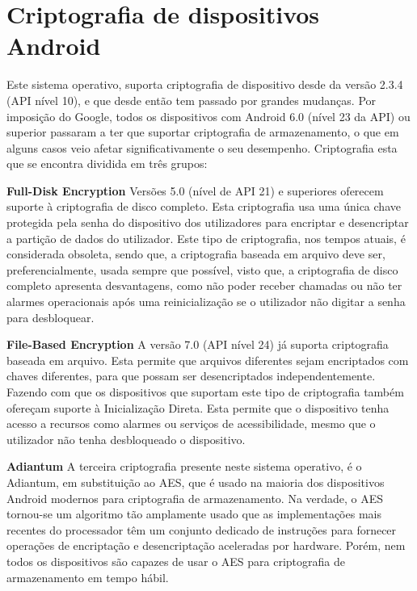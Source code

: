 \documentclass{article}
\begin{document}
\section{Criptografia de dispositivos Android}
Este sistema operativo, suporta criptografia de dispositivo desde da versão 2.3.4 (API nível 10), e que desde então tem passado por grandes mudanças. Por imposição do Google, todos os dispositivos com Android 6.0 (nível 23 da API) ou superior passaram a ter que suportar criptografia de armazenamento, o que em alguns casos veio afetar significativamente o seu desempenho. Criptografia esta que se encontra dividida em três grupos: 
\\
\par \textbf{Full-Disk Encryption} 
Versões 5.0 (nível de API 21) e superiores oferecem suporte à criptografia de disco completo. Esta criptografia usa uma única chave protegida pela senha do dispositivo dos utilizadores para encriptar e desencriptar a partição de dados do utilizador. Este tipo de criptografia, nos tempos atuais, é considerada obsoleta, sendo que, a criptografia baseada em arquivo deve ser, preferencialmente, usada sempre que possível, visto que, a criptografia de disco completo apresenta desvantagens, como não poder receber chamadas ou não ter alarmes operacionais após uma reinicialização se o utilizador não digitar a senha para desbloquear.
\\
\par \textbf{File-Based Encryption}
A versão 7.0 (API nível 24) já suporta criptografia baseada em arquivo. Esta permite que arquivos diferentes sejam encriptados com chaves diferentes, para que possam ser desencriptados independentemente. Fazendo com que os dispositivos que suportam este tipo de criptografia também ofereçam suporte à Inicialização Direta. Esta permite que o dispositivo tenha acesso a recursos como alarmes ou serviços de acessibilidade, mesmo que o utilizador não tenha desbloqueado o dispositivo.
\\
\par \textbf{Adiantum}
A terceira criptografia presente neste sistema operativo, é o Adiantum, em substituição ao AES, que é usado na maioria dos dispositivos Android modernos para criptografia de armazenamento. Na verdade, o AES tornou-se um algoritmo tão amplamente usado que as implementações mais recentes do processador têm um conjunto dedicado de instruções para fornecer operações de encriptação e desencriptação aceleradas por hardware. Porém, nem todos os dispositivos são capazes de usar o AES para criptografia de armazenamento em tempo hábil. 
\end{document}
